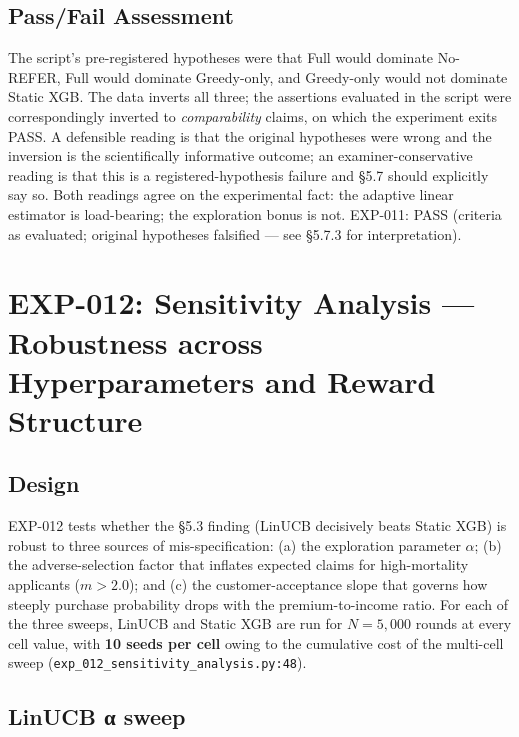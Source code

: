 \subsection{Pass/Fail Assessment}\label{passfail-assessment-4}

The script's pre-registered hypotheses were that Full would dominate No-REFER, Full would dominate Greedy-only, and Greedy-only would not dominate Static XGB. The data inverts all three; the assertions evaluated in the script were correspondingly inverted to \emph{comparability} claims, on which the experiment exits PASS. A defensible reading is that the original hypotheses were wrong and the inversion is the scientifically informative outcome; an examiner-conservative reading is that this is a registered-hypothesis failure and §5.7 should explicitly say so. Both readings agree on the experimental fact: the adaptive linear estimator is load-bearing; the exploration bonus is not. EXP-011: PASS (criteria as evaluated; original hypotheses falsified --- see §5.7.3 for interpretation).

\section{EXP-012: Sensitivity Analysis --- Robustness across Hyperparameters and Reward Structure}\label{exp-012-sensitivity-analysis-robustness-across-hyperparameters-and-reward-structure}

\subsection{Design}\label{design-1}

EXP-012 tests whether the §5.3 finding (LinUCB decisively beats Static XGB) is robust to three sources of mis-specification: (a) the exploration parameter \(\alpha\); (b) the adverse-selection factor that inflates expected claims for high-mortality applicants (\(m > 2.0\)); and (c) the customer-acceptance slope that governs how steeply purchase probability drops with the premium-to-income ratio. For each of the three sweeps, LinUCB and Static XGB are run for \(N = 5{,}000\) rounds at every cell value, with \textbf{10 seeds per cell} owing to the cumulative cost of the multi-cell sweep (\texttt{exp\_012\_sensitivity\_analysis.py:48}).

\subsection{LinUCB α sweep}\label{linucb-ux3b1-sweep}


